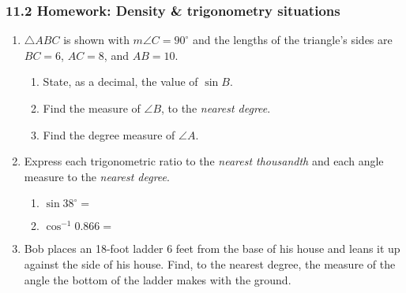 \documentclass[12pt, twoside]{article}
\begin{document}
\subsubsection*{11.2 Homework: Density \& trigonometry situations}
 \begin{enumerate}

   \item $\triangle ABC$ is shown with $m\angle C=90^\circ$ and the lengths of the triangle's sides are $BC=6$, $AC=8$, and $AB=10$.
   \begin{multicols}{2}
         \begin{enumerate}
         \item State, as a decimal, the value of $\sin B$. \vspace{1.25cm}
         \item Find the measure of $\angle B$, to the \emph{nearest degree}. \vspace{1.25cm}
         \item Find the degree measure of $\angle A$.
       \end{enumerate}
     \end{multicols}
     \vspace{1.5cm}


   \item Express each trigonometric ratio to the \emph{nearest thousandth} and each angle measure to the \emph{nearest degree}.
     \begin{multicols}{2}
       \begin{enumerate}
         \item $\sin 38^\circ =$ \vspace{0.5cm}
         \item $\cos^{-1} 0.866 =$ \vspace{0.5cm}
       \end{enumerate}
     \end{multicols} \vspace{0.5cm}

   \item Bob places an 18-foot ladder 6 feet from the base of his house and leans it up against the side of his house. Find, to the nearest degree, the measure of the angle the bottom of the ladder makes with the ground. \vspace{5cm}



\end{enumerate}
\end{document}
